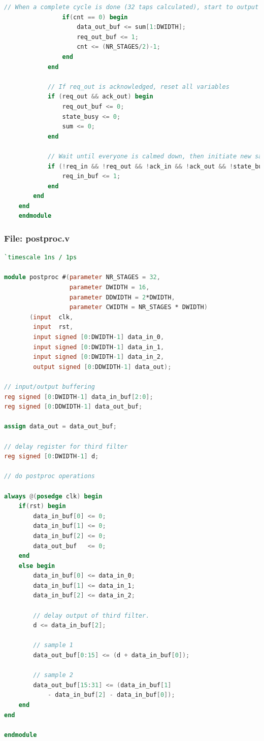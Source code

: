 \documentclass[a4paper,twoside,11pt, fleqn]{article}
\begin{document}
\begin{lstlisting}[language=Verilog]
                // When a complete cycle is done (32 taps calculated), start to output the outcome
                if(cnt == 0) begin
                    data_out_buf <= sum[1:DWIDTH];
                    req_out_buf <= 1;
                    cnt <= (NR_STAGES/2)-1;
                end
            end

            // If req_out is acknowledged, reset all variables
            if (req_out && ack_out) begin
                req_out_buf <= 0;
                state_busy <= 0;
                sum <= 0;
            end

            // Wait until everyone is calmed down, then initiate new sample request
            if (!req_in && !req_out && !ack_in && !ack_out && !state_busy) begin
                req_in_buf <= 1;
            end
        end
    end
    endmodule
\end{lstlisting}

\subsubsection{File: postproc.v}
\begin{lstlisting}[language=Verilog]
`timescale 1ns / 1ps

module postproc #(parameter NR_STAGES = 32,
                  parameter DWIDTH = 16,
                  parameter DDWIDTH = 2*DWIDTH,
                  parameter CWIDTH = NR_STAGES * DWIDTH)
       (input  clk,
        input  rst,
        input signed [0:DWIDTH-1] data_in_0,
        input signed [0:DWIDTH-1] data_in_1,
        input signed [0:DWIDTH-1] data_in_2,
        output signed [0:DDWIDTH-1] data_out);

// input/output buffering
reg signed [0:DWIDTH-1] data_in_buf[2:0];
reg signed [0:DDWIDTH-1] data_out_buf;

assign data_out = data_out_buf;

// delay register for third filter
reg signed [0:DWIDTH-1] d;

// do postproc operations

always @(posedge clk) begin
    if(rst) begin
        data_in_buf[0] <= 0;
        data_in_buf[1] <= 0;
        data_in_buf[2] <= 0;
        data_out_buf   <= 0;
    end
    else begin
        data_in_buf[0] <= data_in_0;
        data_in_buf[1] <= data_in_1;
        data_in_buf[2] <= data_in_2;

        // delay output of third filter.
        d <= data_in_buf[2];

        // sample 1
        data_out_buf[0:15] <= (d + data_in_buf[0]);

        // sample 2
        data_out_buf[15:31] <= (data_in_buf[1] 
        	- data_in_buf[2] - data_in_buf[0]);
    end
end

endmodule
\end{lstlisting}
\end{document}
